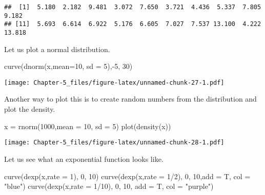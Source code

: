 \documentclass[
]{article}
\newenvironment{Shaded}{\begin{snugshade}}{\end{snugshade}}
\newcommand{\AttributeTok}[1]{\textcolor[rgb]{0.77,0.63,0.00}{#1}}
\newcommand{\DecValTok}[1]{\textcolor[rgb]{0.00,0.00,0.81}{#1}}
\newcommand{\FunctionTok}[1]{\textcolor[rgb]{0.00,0.00,0.00}{#1}}
\newcommand{\NormalTok}[1]{#1}
\newcommand{\OtherTok}[1]{\textcolor[rgb]{0.56,0.35,0.01}{#1}}
\newcommand{\SpecialCharTok}[1]{\textcolor[rgb]{0.00,0.00,0.00}{#1}}
\newcommand{\StringTok}[1]{\textcolor[rgb]{0.31,0.60,0.02}{#1}}
\begin{document}
\begin{verbatim}
##  [1]  5.180  2.182  9.481  3.072  7.650  3.721  4.436  5.337  7.805  9.182
## [11]  5.693  6.614  6.922  5.176  6.605  7.027  7.537 13.100  4.222 13.818
\end{verbatim}

Let us plot a normal distribution.

\begin{Shaded}
\begin{Highlighting}[]
\FunctionTok{curve}\NormalTok{(}\FunctionTok{dnorm}\NormalTok{(x,}\AttributeTok{mean=}\DecValTok{10}\NormalTok{, }\AttributeTok{sd =} \DecValTok{5}\NormalTok{),}\SpecialCharTok{{-}}\DecValTok{5}\NormalTok{, }\DecValTok{30}\NormalTok{)}
\end{Highlighting}
\end{Shaded}

\texttt{[image: Chapter-5\_files/figure-latex/unnamed-chunk-27-1.pdf]}

Another way to plot this is to create random numbers from the
distribution and plot the density.

\begin{Shaded}
\begin{Highlighting}[]
\NormalTok{x }\OtherTok{=} \FunctionTok{rnorm}\NormalTok{(}\DecValTok{1000}\NormalTok{,}\AttributeTok{mean =} \DecValTok{10}\NormalTok{, }\AttributeTok{sd =} \DecValTok{5}\NormalTok{)}
\FunctionTok{plot}\NormalTok{(}\FunctionTok{density}\NormalTok{(x))}
\end{Highlighting}
\end{Shaded}

\texttt{[image: Chapter-5\_files/figure-latex/unnamed-chunk-28-1.pdf]}

Let us see what an exponential function looks like.

\begin{Shaded}
\begin{Highlighting}[]
\FunctionTok{curve}\NormalTok{(}\FunctionTok{dexp}\NormalTok{(x,}\AttributeTok{rate =} \DecValTok{1}\NormalTok{), }\DecValTok{0}\NormalTok{, }\DecValTok{10}\NormalTok{)}
\FunctionTok{curve}\NormalTok{(}\FunctionTok{dexp}\NormalTok{(x,}\AttributeTok{rate =} \DecValTok{1}\SpecialCharTok{/}\DecValTok{2}\NormalTok{), }\DecValTok{0}\NormalTok{, }\DecValTok{10}\NormalTok{,}\AttributeTok{add =}\NormalTok{ T, }\AttributeTok{col =} \StringTok{"blue"}\NormalTok{)}
\FunctionTok{curve}\NormalTok{(}\FunctionTok{dexp}\NormalTok{(x,}\AttributeTok{rate =} \DecValTok{1}\SpecialCharTok{/}\DecValTok{10}\NormalTok{), }\DecValTok{0}\NormalTok{, }\DecValTok{10}\NormalTok{, }\AttributeTok{add =}\NormalTok{ T, }\AttributeTok{col =} \StringTok{"purple"}\NormalTok{)}
\end{Highlighting}
\end{Shaded}
\end{document}
